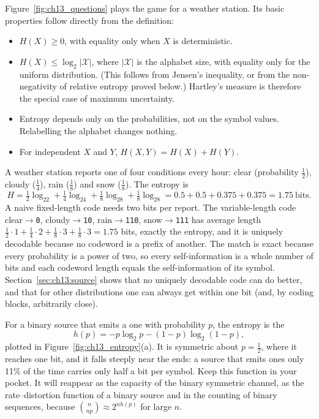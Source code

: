 Figure~\ref{fig:ch13_questions} plays the game for a weather station. Its basic properties follow
directly from the definition:
\begin{itemize}
\item $H(X)\ge0$, with equality only when $X$ is deterministic.
\item $H(X)\le\log_2|\mathcal{X}|$, where $|\mathcal{X}|$ is the alphabet size, with equality only
for the uniform distribution. (This follows from Jensen's inequality, or from the non-negativity
of relative entropy proved below.) Hartley's measure is therefore the special case of maximum
uncertainty.
\item Entropy depends only on the probabilities, not on the symbol values. Relabelling the
alphabet changes nothing.
\item For independent $X$ and $Y$, $H(X,Y)=H(X)+H(Y)$.
\end{itemize}

\begin{worked}
A weather station reports one of four conditions every hour: clear (probability $\frac12$),
cloudy ($\frac14$), rain ($\frac18$) and snow ($\frac18$). The entropy is
\[
H=\tfrac12\log_22+\tfrac14\log_24+\tfrac18\log_28+\tfrac18\log_28
=0.5+0.5+0.375+0.375=1.75\ \text{bits}.
\]
A naive fixed-length code needs two bits per report. The variable-length code
clear$\to$\texttt{0}, cloudy$\to$\texttt{10}, rain$\to$\texttt{110}, snow$\to$\texttt{111} has
average length $\frac12\cdot1+\frac14\cdot2+\frac18\cdot3+\frac18\cdot3=1.75$ bits, exactly the
entropy, and it is uniquely decodable because no codeword is a prefix of another. The match is
exact because every probability is a power of two, so every self-information is a whole number
of bits and each codeword length equals the self-information of its symbol. Section~\ref{sec:ch13:source}
shows that no uniquely decodable code can do better, and that for other distributions one can
always get within one bit (and, by coding blocks, arbitrarily close).
\end{worked}

For a binary source that emits a one with probability $p$, the entropy is the 
\begin{equation}
h(p)=-p\log_2p-(1-p)\log_2(1-p),
\label{eq:ch13:hb}
\end{equation}
plotted in Figure~\ref{fig:ch13_entropy}(a). It is symmetric about $p=\frac12$, where it reaches
one bit, and it falls steeply near the ends: a source that emits ones only 11\% of the time
carries only half a bit per symbol. Keep this function in your pocket. It will reappear as the
capacity of the binary symmetric channel, as the rate--distortion function of a binary source and
in the counting of binary sequences, because $\binom{n}{np}\approx2^{nh(p)}$ for large $n$.

